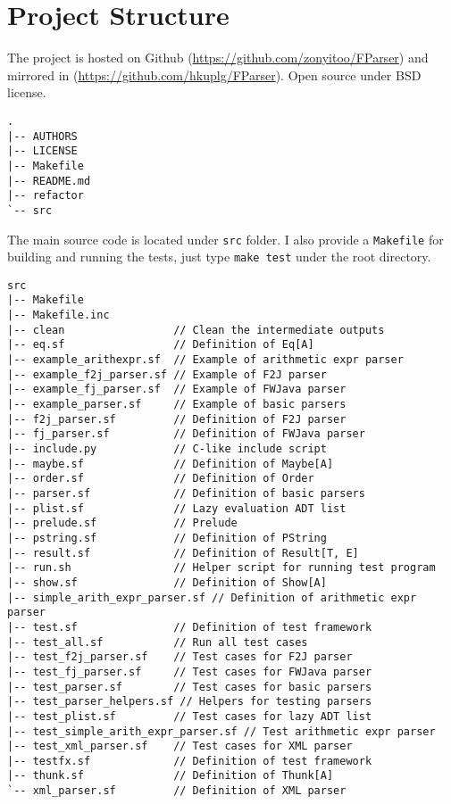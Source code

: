 \section{Project Structure}

The project is hosted on Github (\url{https://github.com/zonyitoo/FParser}) and mirrored in (\url{https://github.com/hkuplg/FParser}). Open source under BSD license.

\begin{lstlisting}[language={}]
.
|-- AUTHORS
|-- LICENSE
|-- Makefile
|-- README.md
|-- refactor
`-- src
\end{lstlisting}

The main source code is located under \texttt{src} folder. I also provide a \texttt{Makefile} for building and running the tests, just type \texttt{make test} under the root directory.

\begin{lstlisting}[language={}]
src
|-- Makefile
|-- Makefile.inc
|-- clean                 // Clean the intermediate outputs
|-- eq.sf                 // Definition of Eq[A]
|-- example_arithexpr.sf  // Example of arithmetic expr parser
|-- example_f2j_parser.sf // Example of F2J parser
|-- example_fj_parser.sf  // Example of FWJava parser
|-- example_parser.sf     // Example of basic parsers
|-- f2j_parser.sf         // Definition of F2J parser
|-- fj_parser.sf          // Definition of FWJava parser
|-- include.py            // C-like include script
|-- maybe.sf              // Definition of Maybe[A]
|-- order.sf              // Definition of Order
|-- parser.sf             // Definition of basic parsers
|-- plist.sf              // Lazy evaluation ADT list
|-- prelude.sf            // Prelude
|-- pstring.sf            // Definition of PString
|-- result.sf             // Definition of Result[T, E]
|-- run.sh                // Helper script for running test program
|-- show.sf               // Definition of Show[A]
|-- simple_arith_expr_parser.sf // Definition of arithmetic expr parser
|-- test.sf               // Definition of test framework
|-- test_all.sf           // Run all test cases
|-- test_f2j_parser.sf    // Test cases for F2J parser
|-- test_fj_parser.sf     // Test cases for FWJava parser
|-- test_parser.sf        // Test cases for basic parsers
|-- test_parser_helpers.sf // Helpers for testing parsers
|-- test_plist.sf         // Test cases for lazy ADT list
|-- test_simple_arith_expr_parser.sf // Test arithmetic expr parser
|-- test_xml_parser.sf    // Test cases for XML parser
|-- testfx.sf             // Definition of test framework
|-- thunk.sf              // Definition of Thunk[A]
`-- xml_parser.sf         // Definition of XML parser
\end{lstlisting}

